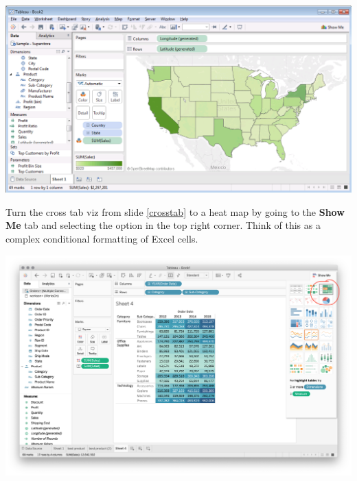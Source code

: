 \documentclass[xcolor=svgnames]{beamer} %
\begin{document}
\begin{frame}
\begin{center}
\includegraphics[width=.9\textwidth]{img/maps}
\end{center}
\end{frame}


\begin{frame}
Turn the cross tab viz from slide \ref{crosstab} to a heat map by going to the {\bf Show Me} tab and selecting the option in the top right corner.  Think of this as a complex conditional formatting of Excel cells.
\begin{center}
\includegraphics[width=.9\textwidth]{img/heatmap2}
\end{center}
\end{frame}
\end{document}
